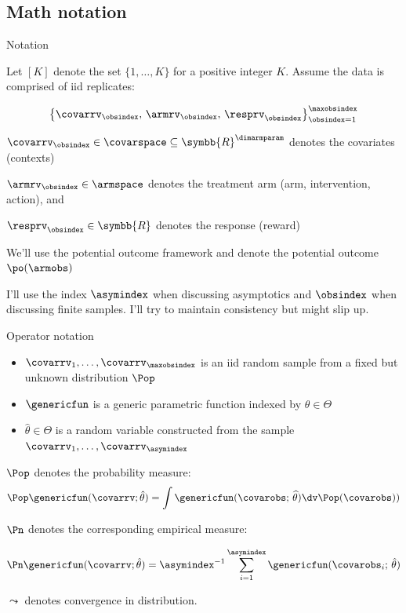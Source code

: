 \documentclass[aspectratio=169, professionalfonts, handout]{beamer}
\begin{document}
\subsection{Math notation}
\begin{frame}[label={sec:org00d2d44}]{Notation}

	Let $[K]$ denote the set $\{1, \ldots, K \}$ for a positive integer $K$. Assume
	the data is comprised of iid replicates:

	\begin{equation*}
		\left\{{\covarrv}_{\obsindex},\, {\armrv}_{\obsindex},\,
		{\resprv}_{\obsindex} \right\}_{\obsindex = 1}^{\maxobsindex}
	\end{equation*}


	$\covarrv_{\obsindex} \in \covarspace \subseteq
		\symbb{R}^{\dimarmparam}$ denotes the covariates (contexts)

	$\armrv_{ \obsindex} \in \armspace$ denotes the treatment arm (arm,
	intervention, action), and

	$\resprv_{ \obsindex} \in \symbb{R}$ denotes the response (reward)

	\vfill \pause

	We'll use the potential outcome framework and denote the potential outcome 	$\po(\armobs)$

	\vfill \pause
	I'll use the index $\asymindex$ when discussing asymptotics and $\obsindex$ when discussing finite samples.	I'll try to maintain consistency but might slip up.
\end{frame}


\begin{frame}{Operator notation}
	\begin{itemize}
		\item $\covarrv_1, \ldots, \covarrv_{\maxobsindex}$ is an iid random sample from a
		      fixed but unknown distribution $\Pop$
		\item $\genericfun$ is a generic parametric function indexed by $\theta \in \Theta$
		\item $\hat{\theta} \in \Theta$ is a random variable constructed from the sample
		      $\covarrv_1, \ldots, \covarrv_{\asymindex}$
	\end{itemize}
	\vfill \pause

	$\Pop$ denotes the probability measure:
	\begin{equation*}
		\Pop \genericfun(\covarrv; \hat{\theta}) = \int \genericfun(\covarobs;\,\widehat{\theta}) \dv
		\Pop(\covarobs))
	\end{equation*}

	\vfill \pause $\Pn$ denotes the corresponding empirical measure:

	\begin{equation*}
		\Pn \genericfun(\covarrv; \hat{\theta}) = \asymindex^{-1}\sum_{i =
			1}^{\asymindex} \genericfun(\covarobs_{i};\,\hat{\theta})
	\end{equation*}
	\vfill \pause

	$\leadsto$ denotes convergence in distribution.

	\vfill
\end{frame}
\end{document}
